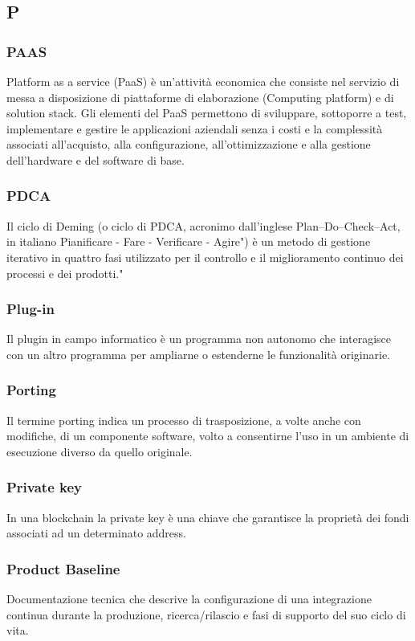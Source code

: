 \subsection*{\textbf{\hfill \Huge{P} \hfill}} 
\subsubsection*{PAAS}
Platform as a service (PaaS) è un'attività economica che consiste nel servizio di messa a disposizione di piattaforme di elaborazione (Computing platform) e di solution stack. Gli elementi del PaaS permettono di sviluppare, sottoporre a test, implementare e gestire le applicazioni aziendali senza i costi e la complessità associati all'acquisto, alla configurazione, all'ottimizzazione e alla gestione dell'hardware e del software di base.
\subsubsection*{PDCA}
Il ciclo di Deming (o ciclo di PDCA, acronimo dall'inglese Plan–Do–Check–Act, in italiano Pianificare - Fare - Verificare - Agire") è un metodo di gestione iterativo in quattro fasi utilizzato per il controllo e il miglioramento continuo dei processi e dei prodotti."
\subsubsection*{Plug-in}
Il plugin in campo informatico è un programma non autonomo che interagisce con un altro programma per ampliarne o estenderne le funzionalità originarie.
\subsubsection*{Porting}
Il termine porting indica un processo di trasposizione, a volte anche con modifiche, di un componente software, volto a consentirne l'uso in un ambiente di esecuzione diverso da quello originale.
\subsubsection*{Private key}
In una blockchain la private key è una chiave che garantisce la proprietà dei fondi associati ad un determinato address.
\subsubsection*{Product Baseline}
Documentazione tecnica che descrive la configurazione di una integrazione continua durante la produzione, ricerca/rilascio e fasi di supporto del suo ciclo di vita.
